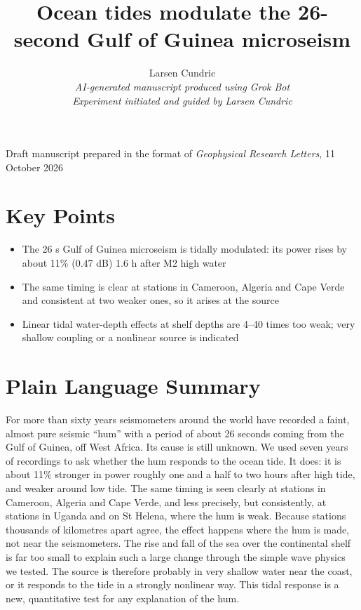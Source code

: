 \documentclass[11pt]{article}
\title{Ocean tides modulate the 26-second Gulf of Guinea microseism}
\author{Larsen Cundric\\[6pt]
\normalsize\textit{AI-generated manuscript produced using Grok Bot}\\
\normalsize\textit{Experiment initiated and guided by Larsen Cundric}}
\date{}
\begin{document}
\maketitle
\vspace{-2em}
\begin{center}\small Draft manuscript prepared in the format of \emph{Geophysical Research Letters}, 11 October 2026\end{center}

\section*{Key Points}
\begin{itemize}
\item The 26 s Gulf of Guinea microseism is tidally modulated: its power rises by about 11\% (0.47 dB) 1.6 h after M2 high water
\item The same timing is clear at stations in Cameroon, Algeria and Cape Verde and consistent at two weaker ones, so it arises at the source
\item Linear tidal water-depth effects at shelf depths are 4--40 times too weak; very shallow coupling or a nonlinear source is indicated
\end{itemize}

\section*{Plain Language Summary}
For more than sixty years seismometers around the world have recorded a faint, almost pure seismic ``hum'' with a period of about 26 seconds coming from the Gulf of Guinea, off West Africa. Its cause is still unknown. We used seven years of recordings to ask whether the hum responds to the ocean tide. It does: it is about 11\% stronger in power roughly one and a half to two hours after high tide, and weaker around low tide. The same timing is seen clearly at stations in Cameroon, Algeria and Cape Verde, and less precisely, but consistently, at stations in Uganda and on St Helena, where the hum is weak. Because stations thousands of kilometres apart agree, the effect happens where the hum is made, not near the seismometers. The rise and fall of the sea over the continental shelf is far too small to explain such a large change through the simple wave physics we tested. The source is therefore probably in very shallow water near the coast, or it responds to the tide in a strongly nonlinear way. This tidal response is a new, quantitative test for any explanation of the hum.
\end{document}
